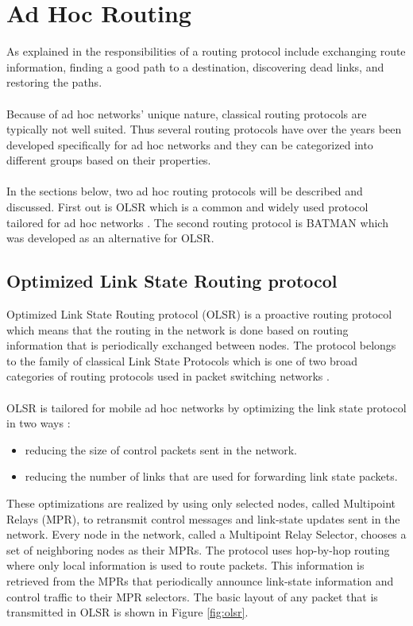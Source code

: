 \section{Ad Hoc Routing}\label{ad_hoc_routing}
As explained in \cite{murthy-ad} the responsibilities of a routing protocol include exchanging route information, finding a good path to a destination, discovering dead links, and restoring the paths. 
\\\\
Because of ad hoc networks' unique nature, classical routing protocols are typically not well suited. Thus several routing protocols have over the years been developed specifically for ad hoc networks and they can be categorized into different groups based on their properties.
\\\\
In the sections below, two ad hoc routing protocols will be described and discussed. First out is OLSR which is a common and widely used protocol tailored for ad hoc networks \cite{zafar2008using}. The second routing protocol is BATMAN which was developed as an alternative for OLSR.

\subsection{Optimized Link State Routing protocol}
Optimized Link State Routing protocol (OLSR) is a proactive routing protocol which means that the routing in the network is done based on routing information that is periodically exchanged between nodes. The protocol belongs to the family of classical Link State Protocols which is one of two broad categories of routing protocols used in packet switching networks \cite{clausen2003rfc3626}.
\\\\
OLSR is tailored for mobile ad hoc networks by optimizing the link state protocol in two ways \cite{murthy-ad}: 

\begin{itemize}
\item reducing the size of control packets sent in the network.
\item reducing the number of links that are used for forwarding link state packets.
\end{itemize}

\noindent
These optimizations are realized by using only selected nodes, called Multipoint Relays (MPR), to retransmit control messages and link-state updates sent in the network. Every node in the network, called a Multipoint Relay Selector, chooses a set of neighboring nodes as their MPRs. The protocol uses hop-by-hop routing where only local information is used to route packets. This information is retrieved from the MPRs that periodically announce link-state information and control traffic to their MPR selectors. The basic layout of any packet that is transmitted in OLSR is shown in Figure \ref{fig:olsr}.

